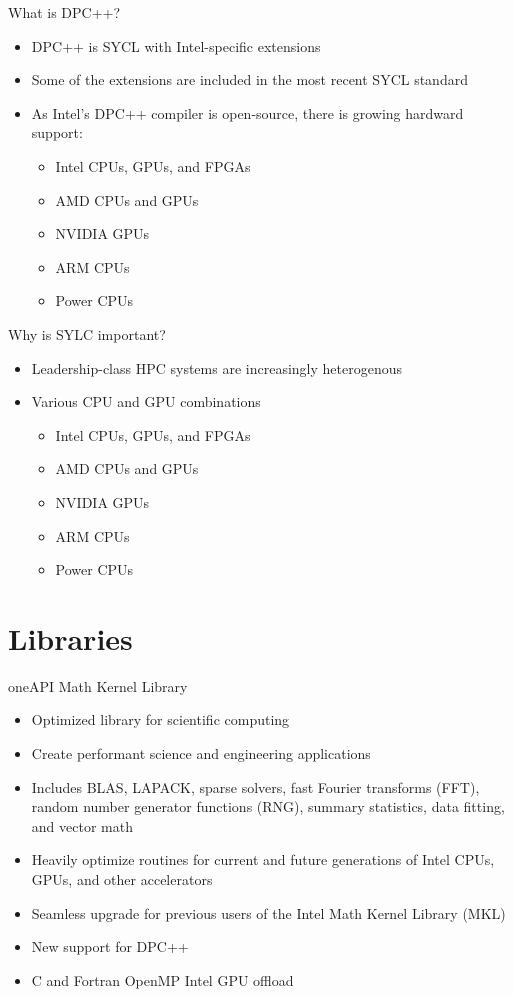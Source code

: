 \documentclass[aspectratio=169]{beamer}
\begin{document}
\begin{frame}{What is DPC++?}
\begin{itemize}
  \item DPC++ is SYCL with Intel-specific extensions
  \item Some of the extensions are included in the most recent SYCL standard
  \item As Intel's DPC++ compiler is open-source, there is growing hardward support:
  \begin{itemize}
    \item Intel CPUs, GPUs, and FPGAs
    \item AMD CPUs and GPUs
    \item NVIDIA GPUs
    \item ARM CPUs
    \item Power CPUs
  \end{itemize}
\end{itemize}
\end{frame}

\begin{frame}{Why is SYLC important?}
\begin{itemize}
  \item Leadership-class HPC systems are increasingly heterogenous
  \item Various CPU and GPU combinations
  \begin{itemize}
    \item Intel CPUs, GPUs, and FPGAs
    \item AMD CPUs and GPUs
    \item NVIDIA GPUs
    \item ARM CPUs
    \item Power CPUs
  \end{itemize}
\end{itemize}
\end{frame}

\section{Libraries}

\begin{frame}{oneAPI Math Kernel Library}
\begin{itemize}
  \item Optimized library for scientific computing
  \item Create performant science and engineering applications
  \item Includes BLAS, LAPACK, sparse solvers, fast Fourier transforms (FFT), random number generator functions (RNG), summary statistics, data fitting, and vector math
  \item Heavily optimize routines for current and future generations of Intel CPUs, GPUs, and other accelerators
  \item Seamless upgrade for previous users of the Intel Math Kernel Library (MKL)
  \item New support for DPC++
  \item C and Fortran OpenMP Intel GPU offload
\end{itemize}
\end{frame}
\end{document}
